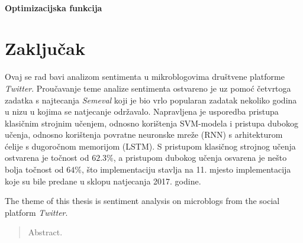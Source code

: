 \documentclass[times, utf8, zavrsni]{fer}
\begin{document}
\subsubsection{Optimizacijska funkcija}



\chapter{Zaključak}



\printglossaries

\begin{sazetak}
Ovaj se rad bavi analizom sentimenta u mikroblogovima društvene platforme \emph{Twitter}. Proučavanje teme analize sentimenta ostvareno je uz pomoć četvrtoga zadatka s najtecanja \emph{Semeval} koji je bio vrlo popularan zadatak nekoliko godina u nizu u kojima se natjecanje održavalo. Napravljena je usporedba pristupa klasičnim strojnim učenjem, odnosno korištenja \gls{SVM}-modela i pristupa dubokog učenja, odnosno korištenja povratne neuronske mreže (\gls{RNN}) s arhitekturom ćelije s dugoročnom memorijom (\gls{LSTM}). S pristupom klasičnog strojnog učenja ostvarena je točnost od $62.3\%$, a pristupom dubokog učenja osvarena je nešto bolja točnost od $64\%$, što implementaciju stavlja na 11. mjesto implementacija koje su bile predane u sklopu natjecanja 2017. godine.

\end{sazetak}

The theme of this thesis is sentiment analysis on microblogs from the social platform \emph{Twitter}. %

\begin{abstract}
Abstract.

\end{abstract}
\end{document}
